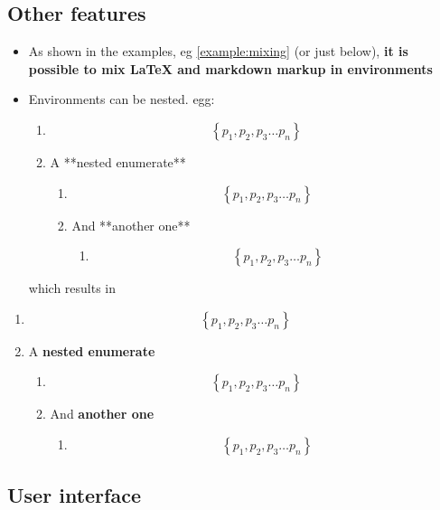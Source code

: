     \subsection{Other features}\label{other-features}

    \begin{itemize}
\item
  As shown in the examples, eg \ref{example:mixing} (or just below),
  \textbf{it is possible to mix LaTeX and markdown markup in
  environments}
\item
  Environments can be nested. egg:

  \begin{listing}
  \begin{enumerate}
  \item $$ \left\{ p_1, p_2, p_3 \ldots p_n \right\} $$
  \item A **nested enumerate**
  \begin{enumerate}
  \item $$ \left\{ p_1, p_2, p_3 \ldots p_n \right\} $$
  \item And **another one**
  \begin{enumerate}
  \item $$ \left\{ p_1, p_2, p_3 \ldots p_n \right\} $$
  \end{enumerate}
  \end{enumerate}
  \end{enumerate}
  \end{listing}

  which results in
\end{itemize}

    \begin{enumerate} \item
\[ \left\{ p_1, p_2, p_3 \ldots p_n \right\} \] \item A \textbf{nested
enumerate} \begin{enumerate} \item
\[ \left\{ p_1, p_2, p_3 \ldots p_n \right\} \] \item And
\textbf{another one} \begin{enumerate} \item
\[ \left\{ p_1, p_2, p_3 \ldots p_n \right\} \] \end{enumerate}
\end{enumerate} \end{enumerate}

    \subsection{User interface}\label{user-interface}


